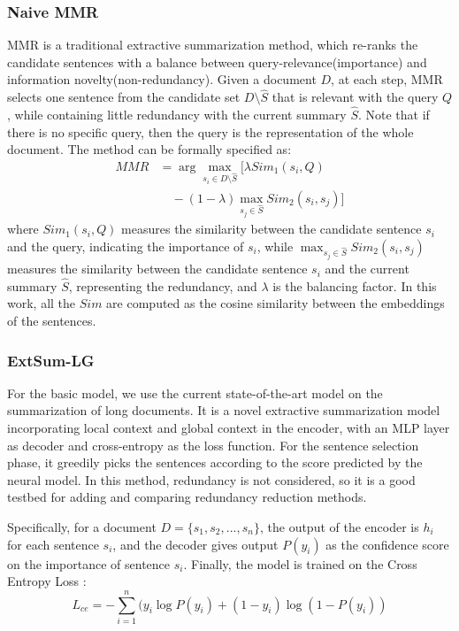 \documentclass[11pt,a4paper]{article}
\begin{document}
\subsubsection*{Naive MMR}
MMR \cite{mmr} is a traditional extractive summarization method, which re-ranks the candidate sentences with a balance between query-relevance(importance) and information novelty(non-redundancy).
Given a document $D$, at each step, MMR selects one sentence from the candidate set $D \setminus \hat{S}$ that is relevant with the query $Q$, while containing little redundancy with the current summary $\hat{S}$. Note that if there is no specific query, then the query is the representation of the whole document. The method can be formally specified as:
\vspace{-2mm}
\begin{align*}
MMR &= \arg\max_{s_i \in D \setminus \hat{S}}[\lambda Sim_1(s_i,Q)\\
&\quad-(1-\lambda)\max_{s_j\in \hat{S}}Sim_2(s_i,s_j)]
\end{align*}
where $Sim_1(s_i,Q)$ measures the similarity between the candidate sentence $s_i$ and the query, indicating the importance of $s_i$, while  $\max_{s_j\in \hat{S}}Sim_2(s_i,s_j)$ measures the similarity between the candidate sentence $s_i$ and the current summary $\hat{S}$, representing the redundancy, and $\lambda$ is the balancing factor. In this work, all the $Sim$ are computed as the cosine similarity between the embeddings of the sentences. 

\subsubsection*{ExtSum-LG}
For the basic model, we use the current state-of-the-art model \cite{xiao-carenini-2019-extractive} on the summarization of long documents. It is a novel extractive summarization model incorporating local context and global context in the encoder, with an MLP layer as decoder and cross-entropy as the loss function. For the sentence selection phase, it greedily picks the sentences according to the score predicted by the neural model. In this method, redundancy is not considered, so it is a good testbed for adding and comparing redundancy reduction methods.

Specifically, for a document $D=\{s_1,s_2,...,s_n\}$, the output of the encoder is $h_i$ for each sentence $s_i$, and the decoder gives output $P(y_i)$ as the confidence score on the importance of sentence $s_i$. Finally, the model is trained on the Cross Entropy Loss :
\vspace{-1mm}
$$L_{ce} = -\sum_{i=1}^{n}(y_i\log{P(y_i)}+(1-y_i)\log{(1-P(y_i))}$$
\end{document}
